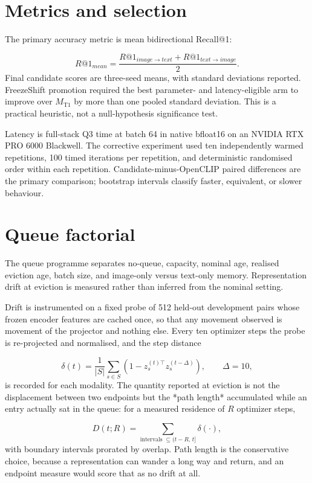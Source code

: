 \documentclass[11pt,a4paper,oneside]{report}
\newcommand{\MTone}{\ensuremath{M_{\mathrm{T1}}}}
\begin{document}
\section{Metrics and selection}
The primary accuracy metric is mean bidirectional Recall@1:

\begin{equation*}
R@1_{mean}=\frac{R@1_{image\rightarrow text}+R@1_{text\rightarrow image}}{2}.
\end{equation*}
Final candidate scores are three-seed means, with standard deviations reported. FreezeShift promotion required the best parameter- and latency-eligible arm to improve over \MTone{} by more than one pooled standard deviation. This is a practical heuristic, not a null-hypothesis significance test.

Latency is full-stack Q3 time at batch 64 in native bfloat16 on an NVIDIA RTX PRO 6000 Blackwell. The corrective experiment used ten independently warmed repetitions, 100 timed iterations per repetition, and deterministic randomised order within each repetition. Candidate-minus-OpenCLIP paired differences are the primary comparison; bootstrap intervals classify faster, equivalent, or slower behaviour.

\section{Queue factorial}
The queue programme separates no-queue, capacity, nominal age, realised eviction age, batch size, and image-only versus text-only memory. Representation drift at eviction is measured rather than inferred from the nominal setting.

Drift is instrumented on a fixed probe of 512 held-out development pairs whose frozen encoder features are cached once, so that any movement observed is movement of the projector and nothing else. Every ten optimizer steps the probe is re-projected and normalised, and the step distance

\begin{equation*}
\delta(t) = \frac{1}{|S|} \sum_{s \in S}
\left( 1 - z_s^{(t)\top} z_s^{(t - \Delta)} \right),
\qquad \Delta = 10,
\end{equation*}
is recorded for each modality. The quantity reported at eviction is not the displacement between two endpoints but the *path length* accumulated while an entry actually sat in the queue: for a measured residence of $R$ optimizer steps,

\begin{equation*}
D(t; R) = \sum_{\text{intervals } \subseteq (t - R,\, t]} \delta(\cdot),
\end{equation*}
with boundary intervals prorated by overlap. Path length is the conservative choice, because a representation can wander a long way and return, and an endpoint measure would score that as no drift at all.
\end{document}
